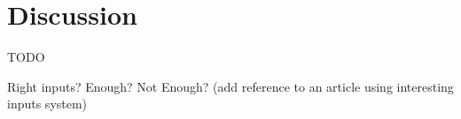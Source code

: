 \section{Discussion}\label{section:discussion}

TODO

Right inputs? Enough? Not Enough? (add reference to an article using interesting inputs system)

